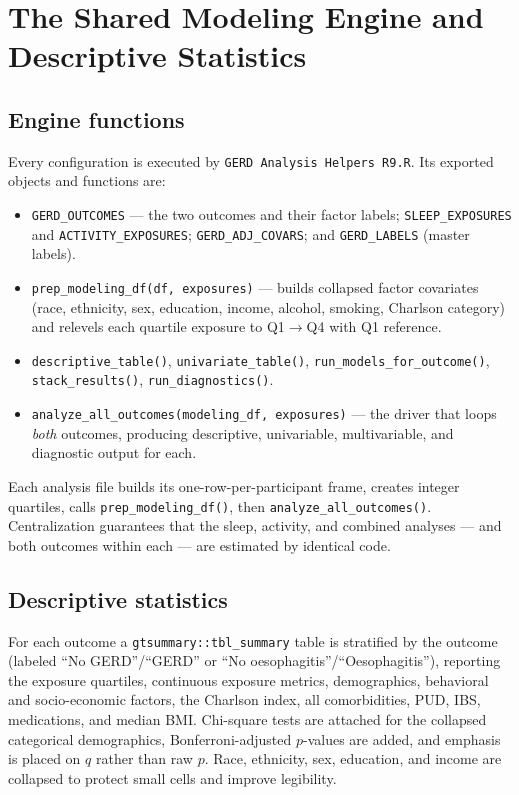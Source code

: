 \documentclass[11pt]{article}
\newcommand{\code}[1]{\texttt{\small #1}}
\begin{document}
\section{The Shared Modeling Engine and Descriptive Statistics}

\subsection{Engine functions}
Every configuration is executed by \code{GERD Analysis Helpers R9.R}. Its exported objects and
functions are:
\begin{itemize}[leftmargin=1.4em,itemsep=1pt]
  \item \code{GERD_OUTCOMES} --- the two outcomes and their factor labels; \code{SLEEP_EXPOSURES} and
  \code{ACTIVITY_EXPOSURES}; \code{GERD_ADJ_COVARS}; and
  \code{GERD_LABELS} (master labels).
  \item \code{prep_modeling_df(df, exposures)} --- builds collapsed factor covariates (race, ethnicity,
  sex, education, income, alcohol, smoking, Charlson category) and relevels each quartile exposure to
  Q1$\rightarrow$Q4 with Q1 reference.
  \item \code{descriptive_table()}, \code{univariate_table()}, \code{run_models_for_outcome()},
  \code{stack_results()}, \code{run_diagnostics()}.
  \item \code{analyze_all_outcomes(modeling_df, exposures)} --- the driver that loops \emph{both}
  outcomes, producing descriptive, univariable, multivariable, and diagnostic output for each.
\end{itemize}
Each analysis file builds its one-row-per-participant frame, creates integer quartiles, calls
\code{prep_modeling_df()}, then \code{analyze_all_outcomes()}. Centralization guarantees that the sleep,
activity, and combined analyses --- and both outcomes within each --- are estimated by identical code.

\subsection{Descriptive statistics}
For each outcome a \code{gtsummary::tbl_summary} table is stratified by the outcome (labeled
``No GERD''/``GERD'' or ``No oesophagitis''/``Oesophagitis''), reporting the exposure quartiles,
continuous exposure metrics, demographics, behavioral and socio-economic factors, the Charlson index,
all comorbidities, PUD, IBS, medications, and median BMI. Chi-square tests are attached for the
collapsed categorical demographics, Bonferroni-adjusted $p$-values are added, and emphasis is placed
on $q$ rather than raw $p$. Race, ethnicity, sex, education, and income are collapsed to protect small
cells and improve legibility.
\end{document}
